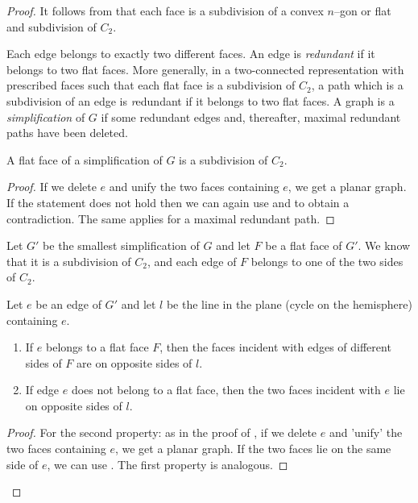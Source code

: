 \documentclass[invmat]{svjour}
\begin{document}
\begin{proof}
It follows from   that each face is a subdivision of a convex
$n$--gon or flat and subdivision of $C_2$.

Each edge belongs to exactly two different faces. An edge is
\emph{redundant} if it belongs to two flat faces. More generally, 
in a two-connected representation with prescribed faces such that 
each flat face is a subdivision of $C_2$, a path which is a
subdivision of an edge is {\emph redundant} if it belongs to two flat faces.
A graph is a \emph{simplification} of $G$ if some redundant edges and,
thereafter, maximal redundant paths have been deleted.

\begin{lemma}
\label{l:simplification_c_2}
A flat face of a simplification of $G$ is a subdivision of $C_2$.
\end{lemma}

\begin{proof}
If we delete $e$ and unify the two faces containing $e$, we get a
planar graph.  If the statement does not hold then we can again use
 and  to obtain a contradiction. The same
applies for a maximal redundant path.
\end{proof}

Let $G'$ be the smallest simplification of $G$ and let $F$ be a flat face
of $G'$. We know that it is a subdivision of $C_2$, and each edge of $F$
belongs to one of the two sides  of $C_2$.

\begin{lemma}
\label{l:claim10}
Let $e$ be an edge of $G'$  and let $l$ be the line in the plane
(cycle on the hemisphere) containing $e$.
\begin{enumerate}
\item[1.]
If $e$ belongs to a flat face $F$, then the faces incident with
edges of different sides of $F$ are on opposite sides of $l$.
\item[2.]
If edge $e$ does not belong to a flat face, then the two faces
incident with $e$ lie on opposite sides of $l$.
\end{enumerate}
\end{lemma}
\begin{proof}
For the second property: as in the proof of , if we delete $e$
and 'unify' the two faces containing $e$, we get a planar graph. If the
two faces lie on the same side of $e$, we can use . The first
property is analogous.
\end{proof}


\end{proof}
\end{document}

